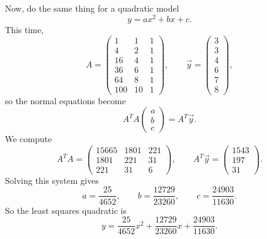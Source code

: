 \documentclass[10pt]{extarticle}
\begin{document}
\begin{enumerate}[label=(\alph*)]
Now, do the same thing for a quadratic model
\[
y=ax^2+bx+c.
\]
This time,
\[
A=
\begin{pmatrix}
1 & 1 & 1\\
4 & 2 & 1\\
16 & 4 & 1\\
36 & 6 & 1\\
64 & 8 & 1\\
100 & 10 & 1
\end{pmatrix},
\qquad
\vec{y}=
\begin{pmatrix}
3\\3\\4\\6\\7\\8
\end{pmatrix},
\]
so the normal equations become
\[
A^TA
\begin{pmatrix}
a\\b\\c
\end{pmatrix}
=
A^T\vec{y}.
\]
We compute
\[
A^TA=
\begin{pmatrix}
15665 & 1801 & 221\\
1801 & 221 & 31\\
221 & 31 & 6
\end{pmatrix},
\qquad
A^T\vec{y}=
\begin{pmatrix}
1543\\
197\\
31
\end{pmatrix}.
\]
Solving this system gives
\[
a=\frac{25}{4652},
\qquad
b=\frac{12729}{23260},
\qquad
c=\frac{24903}{11630}.
\]
So the least squares quadratic is
\[
y=\frac{25}{4652}x^2+\frac{12729}{23260}x+\frac{24903}{11630}.
\]


\end{enumerate}
\end{document}
